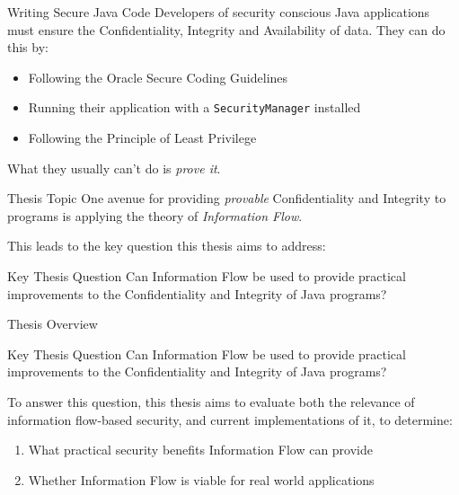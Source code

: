 \begin{frame}{Writing Secure Java Code}
	Developers of security conscious Java applications must ensure the Confidentiality, Integrity and Availability of data. They can do this by:
	
	\begin{itemize}
		\item Following the Oracle Secure Coding Guidelines
		\item Running their application with a \texttt{SecurityManager} installed
		\item Following the Principle of Least Privilege
	\end{itemize}
	
	What they usually can't do is \textit{prove it}.
\end{frame}

\begin{frame}{Thesis Topic}
	One avenue for providing \textit{provable} Confidentiality and Integrity to programs is applying the theory of \textit{Information Flow}.
	
	This leads to the key question this thesis aims to address:
	
	\begin{block}{Key Thesis Question}
		Can Information Flow be used to provide practical improvements to the Confidentiality and Integrity of Java programs?
	\end{block}
\end{frame}

\begin{frame}{Thesis Overview}
	\begin{block}{Key Thesis Question}
		Can Information Flow be used to provide practical improvements to the Confidentiality and Integrity of Java programs?
	\end{block}

	To answer this question, this thesis aims to evaluate both the relevance of information flow-based security, and current implementations of it, to determine:
	
	\begin{enumerate}
		\item What practical security benefits Information Flow can provide
		\item Whether Information Flow is viable for real world applications
	\end{enumerate}
\end{frame}